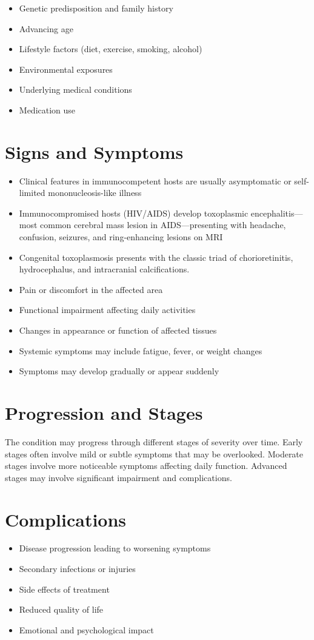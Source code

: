 \begin{itemize}[noitemsep]
  \item Genetic predisposition and family history
  \item Advancing age
  \item Lifestyle factors (diet, exercise, smoking, alcohol)
  \item Environmental exposures
  \item Underlying medical conditions
  \item Medication use
\end{itemize}
\section{Signs and Symptoms}
\begin{itemize}[noitemsep]
  \item Clinical features in immunocompetent hosts are usually asymptomatic or self-limited mononucleosis-like illness
  \item Immunocompromised hosts (HIV/AIDS) develop toxoplasmic encephalitis---most common cerebral mass lesion in AIDS---presenting with headache, confusion, seizures, and ring-enhancing lesions on MRI
  \item Congenital toxoplasmosis presents with the classic triad of chorioretinitis, hydrocephalus, and intracranial calcifications.
  \item Pain or discomfort in the affected area
  \item Functional impairment affecting daily activities
  \item Changes in appearance or function of affected tissues
  \item Systemic symptoms may include fatigue, fever, or weight changes
  \item Symptoms may develop gradually or appear suddenly
\end{itemize}
\section{Progression and Stages}
The condition may progress through different stages of severity over time. Early stages often involve mild or subtle symptoms that may be overlooked. Moderate stages involve more noticeable symptoms affecting daily function. Advanced stages may involve significant impairment and complications.
\section{Complications}
\begin{itemize}[noitemsep]
  \item Disease progression leading to worsening symptoms
  \item Secondary infections or injuries
  \item Side effects of treatment
  \item Reduced quality of life
  \item Emotional and psychological impact
\end{itemize}
